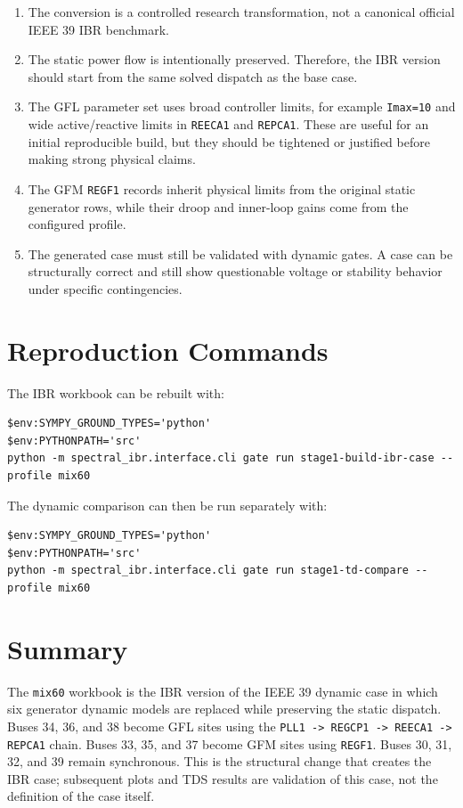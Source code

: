 \documentclass[10pt,letterpaper]{article}
\begin{document}
\begin{enumerate}
  \item The conversion is a controlled research transformation, not a canonical
  official IEEE 39 IBR benchmark.
  \item The static power flow is intentionally preserved. Therefore, the IBR
  version should start from the same solved dispatch as the base case.
  \item The GFL parameter set uses broad controller limits, for example
  \texttt{Imax=10} and wide active/reactive limits in \texttt{REECA1} and
  \texttt{REPCA1}. These are useful for an initial reproducible build, but they
  should be tightened or justified before making strong physical claims.
  \item The GFM \texttt{REGF1} records inherit physical limits from the original
  static generator rows, while their droop and inner-loop gains come from the
  configured profile.
  \item The generated case must still be validated with dynamic gates. A case
  can be structurally correct and still show questionable voltage or stability
  behavior under specific contingencies.
\end{enumerate}

\section{Reproduction Commands}

The IBR workbook can be rebuilt with:

\begin{verbatim}
$env:SYMPY_GROUND_TYPES='python'
$env:PYTHONPATH='src'
python -m spectral_ibr.interface.cli gate run stage1-build-ibr-case --profile mix60
\end{verbatim}

The dynamic comparison can then be run separately with:

\begin{verbatim}
$env:SYMPY_GROUND_TYPES='python'
$env:PYTHONPATH='src'
python -m spectral_ibr.interface.cli gate run stage1-td-compare --profile mix60
\end{verbatim}

\section{Summary}

The \texttt{mix60} workbook is the IBR version of the IEEE 39 dynamic case in
which six generator dynamic models are replaced while preserving the static
dispatch. Buses 34, 36, and 38 become GFL sites using the
\texttt{PLL1 -> REGCP1 -> REECA1 -> REPCA1} chain. Buses 33, 35, and 37 become
GFM sites using \texttt{REGF1}. Buses 30, 31, 32, and 39 remain synchronous.
This is the structural change that creates the IBR case; subsequent plots and
TDS results are validation of this case, not the definition of the case itself.
\end{document}
